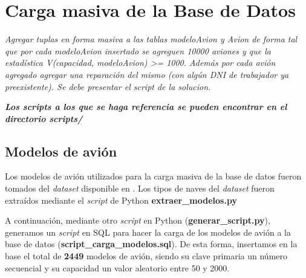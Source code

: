 







\clearpage
\tableofcontents
\clearpage


\section{Carga masiva de la Base de Datos}

\emph{Agregar tuplas en forma masiva a las tablas modeloAvion y Avion de forma tal que por cada modeloAvion insertado se agreguen 10000 aviones y que la estadística V(capacidad, modeloAvion) >= 1000. Además por cada avión agregado agregar una reparación del mismo (con algún DNI de trabajador ya preexistente). Se debe presentar el script de la solucion.} 

\emph{\textbf{Los scripts a los que se haga referencia se pueden encontrar en el directorio scripts/}} 

\subsection{Modelos de avión}

Los modelos de avión utilizados para la carga masiva de la base de datos fueron tomados del \emph{dataset} disponible en \cite{dataset:2013}. Los tipos de naves del \emph{dataset} fueron extraídos mediante el \emph{script} de Python \textbf{extraer\_modelos.py}

A continuación, mediante otro \emph{script} en Python (\textbf{generar\_script.py}), generamos un \emph{script} en SQL para hacer la carga de los modelos de avión a la base de datos (\textbf{script\_carga\_modelos.sql}). De esta forma, insertamos en la base el total de \textbf{2449} modelos de avión, siendo su clave primaria un número secuencial y su capacidad un valor aleatorio entre 50 y 2000. 

